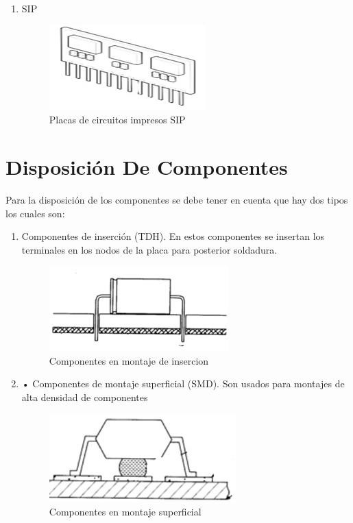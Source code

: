 \documentclass[a4paper,12pt,twoside]{proyectotanquesecci}
\begin{document}
\begin{enumerate}
\begin{enumerate}
  \item SIP
  \begin{figure}[h]
   \centering
   \includegraphics[scale=1.0]{SIP.jpg}
   \renewcommand{\figurename}{Fig.}
   \caption{Placas de circuitos impresos SIP}
   \label{Placas de circuitos impresos SIP}
   \end{figure}
\end{enumerate}
\end{enumerate}

\section{Disposición  De Componentes}

Para la disposición de los  componentes se debe tener en cuenta que hay dos tipos los cuales son:

\begin{enumerate}
\item Componentes de inserción (TDH). En estos componentes se insertan los terminales en los nodos de la placa para posterior soldadura.
\begin{figure}[h]
  \centering
  \includegraphics[scale=1.0]{TDH.jpg}
  \renewcommand{\figurename}{Fig.}
  \caption{Componentes en montaje de insercion}
  \label{Componentes en montaje de insercion}
  \end{figure}
\item •	Componentes de montaje superficial (SMD). Son usados  para montajes de alta densidad de componentes
\begin{figure}[h]
  \centering
  \includegraphics[scale=1.0]{SMD.jpg}
  \renewcommand{\figurename}{Fig.}
  \caption{Componentes en montaje superficial}
  \label{Componentes en montaje Superficial}
  \end{figure}
\end{enumerate}
\end{document}

